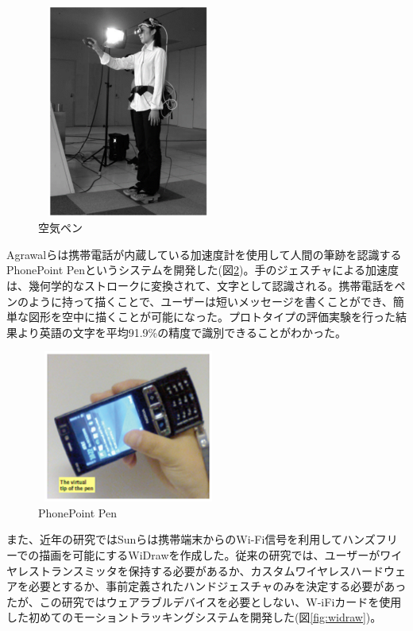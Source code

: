 \documentclass[11pt,a4j, titlepage]{jarticle} %
\begin{document}
\begin{figure}[H]
  \begin{center}
    \includegraphics[clip,height=7.0cm,width=6.0cm]{./kuukipen.eps}
    \caption{空気ペン}
    \label{fig:kuukipen}
  \end{center}
\end{figure}

Agrawalら\cite{agrawal}は携帯電話が内蔵している加速度計を使用して人間の筆跡を認識するPhonePoint Penというシステムを開発した(図\ref{fig:phonepointpen})。手のジェスチャによる加速度は、幾何学的なストロークに変換されて、文字として認識される。携帯電話をペンのように持って描くことで、ユーザーは短いメッセージを書くことができ、簡単な図形を空中に描くことが可能になった。プロトタイプの評価実験を行った結果より英語の文字を平均91.9\%の精度で識別できることがわかった。

\begin{figure}[H]
  \begin{center}
    \includegraphics[clip,height=5.0cm,width=6.0cm]{./phonepointpen.eps}
    \caption{PhonePoint Pen}
    \label{fig:phonepointpen}
  \end{center}
\end{figure}

また、近年の研究ではSunら\cite{sun}は携帯端末からのWi-Fi信号を利用してハンズフリーでの描画を可能にするWiDrawを作成した。従来の研究では、ユーザーがワイヤレストランスミッタを保持する必要があるか、カスタムワイヤレスハードウェアを必要とするか、事前定義されたハンドジェスチャのみを決定する必要があったが、この研究ではウェアラブルデバイスを必要としない、W-iFiカードを使用した初めてのモーショントラッキングシステムを開発した(図\ref{fig:widraw})。
\end{document}

